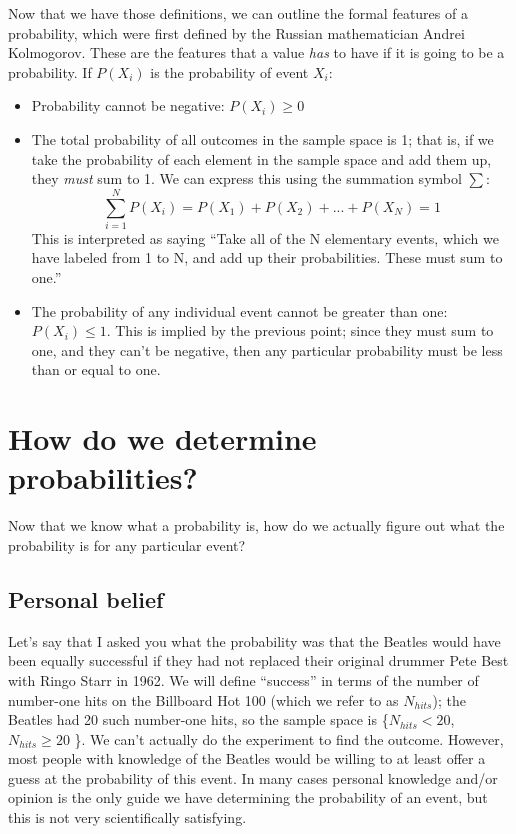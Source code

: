 \documentclass[12pt,]{book}
\providecommand{\tightlist}{%
  \setlength{\itemsep}{0pt}\setlength{\parskip}{0pt}}
\theoremstyle{definition}
\theoremstyle{definition}
\theoremstyle{definition}
\theoremstyle{remark}
\begin{document}
Now that we have those definitions, we can outline the formal features of a probability, which were first defined by the Russian mathematician Andrei Kolmogorov. These are the features that a value \emph{has} to have if it is going to be a probability. If \(P(X_i)\) is the probability of event \(X_i\):

\begin{itemize}
\tightlist
\item
  Probability cannot be negative: \(P(X_i) \ge 0\)
\item
  The total probability of all outcomes in the sample space is 1; that is, if we take the probability of each element in the sample space and add them up, they \emph{must} sum to 1. We can express this using the summation symbol \(\sum\):
  \[
  \sum_{i=1}^N{P(X_i)} = P(X_1) + P(X_2) + ... + P(X_N) = 1
  \]
  This is interpreted as saying ``Take all of the N elementary events, which we have labeled from 1 to N, and add up their probabilities. These must sum to one.''\\
\item
  The probability of any individual event cannot be greater than one: \(P(X_i)\le 1\). This is implied by the previous point; since they must sum to one, and they can't be negative, then any particular probability must be less than or equal to one.
\end{itemize}

\hypertarget{how-do-we-determine-probabilities}{%
\section{How do we determine probabilities?}\label{how-do-we-determine-probabilities}}

Now that we know what a probability is, how do we actually figure out what the probability is for any particular event?

\hypertarget{personal-belief}{%
\subsection{Personal belief}\label{personal-belief}}

Let's say that I asked you what the probability was that the Beatles would have been equally successful if they had not replaced their original drummer Pete Best with Ringo Starr in 1962. We will define ``success'' in terms of the number of number-one hits on the Billboard Hot 100 (which we refer to as \(N_{hits}\)); the Beatles had 20 such number-one hits, so the sample space is \{\(N_{hits} < 20\),\(N_{hits} \ge 20\) \}. We can't actually do the experiment to find the outcome. However, most people with knowledge of the Beatles would be willing to at least offer a guess at the probability of this event. In many cases personal knowledge and/or opinion is the only guide we have determining the probability of an event, but this is not very scientifically satisfying.
\end{document}
